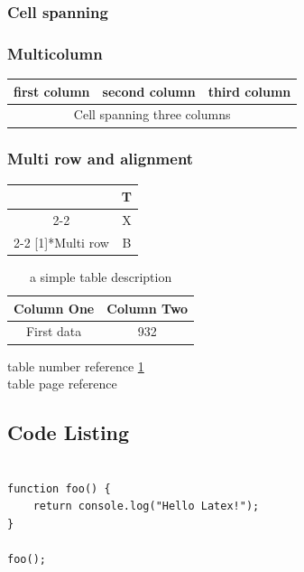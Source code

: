\documentclass[12pt]{article}
\begin{document}
\subsubsection{Cell spanning}

\subsubsection{Multicolumn}
\begin{tabular}{|l|l|l|}
\hline
first column & second column & third column \\
\hline
\multicolumn{3}{|c|}{Cell spanning three columns} \\
\hline
\end{tabular}

\subsubsection{Multi row and alignment}

\begin{tabular}{|c|c|}
\hline
& T \\
\cline{2-2}
& X \\
\cline{2-2}
\multirow[c]{-3}[1]{*}{Multi row} & B \bigstrut \\
\hline
\end{tabular}



\begin{table}[H]
\centering
\begin{tabular}{|c|c|}
\hline
\bfseries Column One & \bfseries Column Two\\
\hline
First data & 932\\ \hline
\end{tabular}
\caption{a simple table description}
\label{table:simple}
\end{table}

table number reference \ref{table:simple} \\
table page reference \pageref{table:simple}

\subsection{Code Listing}
\begin{verbatim}

function foo() {
    return console.log("Hello Latex!");
}

foo();

\end{verbatim}
\end{document}

